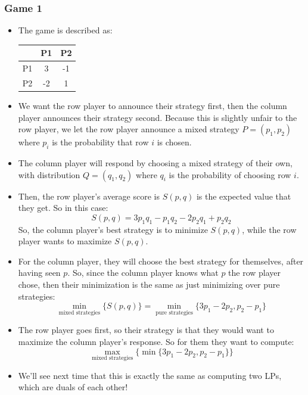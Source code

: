 \subsubsection{Game 1}
\begin{itemize}
	\item The game is described as:
		\begin{center}
			\begin{tabular}{c|c|c}
				& P1 & P2\\
				\hline
				P1 & 3 & -1\\
				\hline
				P2 & -2 & 1
			\end{tabular}
		\end{center}
	\item We want the row player to announce their strategy first, then the column player announces their 
		strategy second. Because this is slightly unfair to the row player, we let the row player 
		announce a mixed strategy \(P = (p_1, p_2)\) where \(p_i\) is the probability that row \(i\) is chosen. 
	\item The column player will respond by choosing a mixed strategy of their own, with 
		distribution \(Q = (q_1, q_2)\) where $q_i$ is the probability of choosing row \(i\). 
	\item Then, the row player's average score is \(S(p, q)\) is the expected value that they get. So in 
		this case:
		\[
		S(p, q) = 3p_1q_1 - p_1q_2 - 2p_2q_1 + p_2q_2
		\] 
		So, the column player's best strategy is to minimize \(S(p, q)\), while the row player wants 
		to maximize \(S(p, q)\).
	\item For the column player, they will choose the best strategy for themselves, after having seen \(p\). 
		So, since the column player knows what \(p\) the row player chose, then their minimization is the 
		same as just minimizing over pure strategies:
		\[
			\min_{\text{mixed strategies}} \{S(p, q)\} = \min_{\text{pure strategies}} 
			\{3p_1 - 2p_2, p_2 - p_1\} 
		\]
	\item The row player goes first, so their strategy is that they would want to maximize the 
		column player's response. So for them they want to compute:
		\[
			\max_{\text{mixed strategies}} \{\min \{3p_1 - 2p_2, p_2 - p_1\} \} 
		\] 
	\item We'll see next time that this is exactly the same as computing two LPs, which are duals of each other!
\end{itemize}
